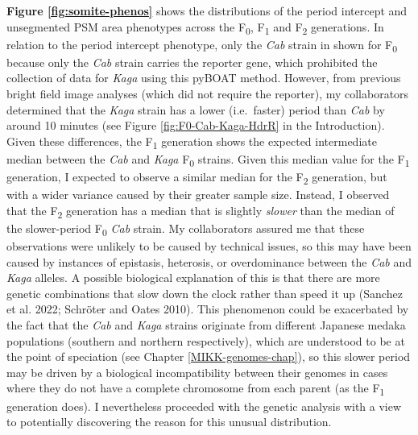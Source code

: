 \documentclass[
]{book}
\begin{document}
\textbf{Figure \ref{fig:somite-phenos}} shows the distributions of the period intercept and unsegmented PSM area phenotypes across the F\textsubscript{0}, F\textsubscript{1} and F\textsubscript{2} generations. In relation to the period intercept phenotype, only the \emph{Cab} strain in shown for F\textsubscript{0} because only the \emph{Cab} strain carries the reporter gene, which prohibited the collection of data for \emph{Kaga} using this pyBOAT method. However, from previous bright field image analyses (which did not require the reporter), my collaborators determined that the \emph{Kaga} strain has a lower (i.e.~faster) period than \emph{Cab} by around 10 minutes (see Figure \ref{fig:F0-Cab-Kaga-HdrR} in the Introduction). Given these differences, the F\textsubscript{1} generation shows the expected intermediate median between the \emph{Cab} and \emph{Kaga} F\textsubscript{0} strains. Given this median value for the F\textsubscript{1} generation, I expected to observe a similar median for the F\textsubscript{2} generation, but with a wider variance caused by their greater sample size. Instead, I observed that the F\textsubscript{2} generation has a median that is slightly \emph{slower} than the median of the slower-period F\textsubscript{0} \emph{Cab} strain. My collaborators assured me that these observations were unlikely to be caused by technical issues, so this may have been caused by instances of epistasis, heterosis, or overdominance between the \emph{Cab} and \emph{Kaga} alleles. A possible biological explanation of this is that there are more genetic combinations that slow down the clock rather than speed it up (Sanchez et al. 2022; Schröter and Oates 2010). This phenomenon could be exacerbated by the fact that the \emph{Cab} and \emph{Kaga} strains originate from different Japanese medaka populations (southern and northern respectively), which are understood to be at the point of speciation (see Chapter \ref{MIKK-genomes-chap}), so this slower period may be driven by a biological incompatibility between their genomes in cases where they do not have a complete chromosome from each parent (as the F\textsubscript{1} generation does). I nevertheless proceeded with the genetic analysis with a view to potentially discovering the reason for this unusual distribution.
\end{document}
